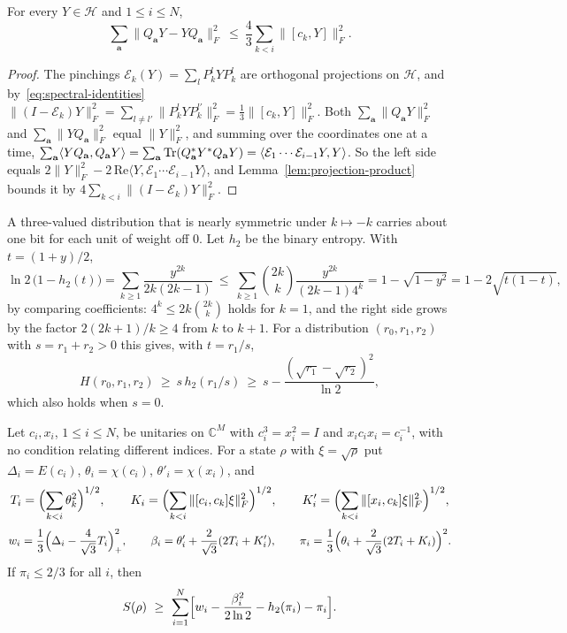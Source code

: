 \begin{lemma}\label{lem:transfer}
For every $Y\in\mathcal H$ and $1\le i\le N$,
\[
\sum_{\mathbf a}\|Q_{\mathbf a}Y-YQ_{\mathbf a}\|_F^2\ \le\ \frac43\sum_{k<i}\|[c_k,Y]\|_F^2 .
\]
\end{lemma}

\begin{proof}
The pinchings $\mathcal E_k(Y)=\sum_lP_k^lYP_k^l$ are orthogonal projections on $\mathcal H$, and by~\eqref{eq:spectral-identities}
$\|(I-\mathcal E_k)Y\|_F^2=\sum_{l\ne l'}\|P_k^lYP_k^{l'}\|_F^2=\frac13\|[c_k,Y]\|_F^2$. Both $\sum_{\mathbf a}\|Q_{\mathbf a}Y\|_F^2$ and
$\sum_{\mathbf a}\|YQ_{\mathbf a}\|_F^2$ equal $\|Y\|_F^2$, and summing over the coordinates one at a time,
$\sum_{\mathbf a}\langle YQ_{\mathbf a},Q_{\mathbf a}Y\rangle=\sum_{\mathbf a}\operatorname{Tr}(Q_{\mathbf a}^*Y^*Q_{\mathbf a}Y)=\langle\mathcal E_1\cdots\mathcal E_{i-1}Y,Y\rangle$.
So the left side equals $2\|Y\|_F^2-2\,\mathrm{Re}\langle Y,\mathcal E_1\cdots\mathcal E_{i-1}Y\rangle$, and Lemma~\ref{lem:projection-product} bounds it by
$4\sum_{k<i}\|(I-\mathcal E_k)Y\|_F^2$.
\end{proof}

A three-valued distribution that is nearly symmetric under $k\mapsto-k$ carries about one bit for each unit of weight off $0$. Let $h_2$ be the
binary entropy. With $t=(1+y)/2$,
\[
\ln2\,\bigl(1-h_2(t)\bigr)=\sum_{k\ge1}\frac{y^{2k}}{2k(2k-1)}\ \le\ \sum_{k\ge1}\binom{2k}k\frac{y^{2k}}{(2k-1)4^k}=1-\sqrt{1-y^2}=1-2\sqrt{t(1-t)},
\]
by comparing coefficients: $4^k\le2k\binom{2k}k$ holds for $k=1$, and the right side grows by the factor $2(2k+1)/k\ge4$ from $k$ to $k+1$. For a
distribution $(r_0,r_1,r_2)$ with $s=r_1+r_2>0$ this gives, with $t=r_1/s$,
\begin{equation}\label{eq:binary-hellinger}
H(r_0,r_1,r_2)\ \ge\ s\,h_2(r_1/s)\ \ge\ s-\frac{(\sqrt{r_1}-\sqrt{r_2})^2}{\ln2},
\end{equation}
which also holds when $s=0$.

\begin{theorem}\label{thm:sector}
Let $c_i,x_i$, $1\le i\le N$, be unitaries on $\mathbb C^M$ with $c_i^3=x_i^2=I$ and $x_ic_ix_i=c_i^{-1}$, with no condition relating different
indices. For a state $\rho$ with $\xi=\sqrt\rho$ put $\Delta_i=E(c_i)$, $\theta_i=\chi(c_i)$, $\theta'_i=\chi(x_i)$, and
\[
T_i=\Bigl(\sum_{k<i}\theta_k^2\Bigr)^{1/2},\qquad K_i=\Bigl(\sum_{k<i}\|[c_i,c_k]\xi\|_F^2\Bigr)^{1/2},\qquad K'_i=\Bigl(\sum_{k<i}\|[x_i,c_k]\xi\|_F^2\Bigr)^{1/2},
\]
\[
w_i=\frac13\Bigl(\Delta_i-\frac4{\sqrt3}T_i\Bigr)_+^2,\qquad\beta_i=\theta'_i+\frac2{\sqrt3}(2T_i+K'_i),\qquad
\pi_i=\frac13\Bigl(\theta_i+\frac2{\sqrt3}(2T_i+K_i)\Bigr)^2 .
\]
If $\pi_i\le2/3$ for all $i$, then
\[
S(\rho)\ \ge\ \sum_{i=1}^N\Bigl[w_i-\frac{\beta_i^2}{2\ln2}-h_2(\pi_i)-\pi_i\Bigr].
\]
\end{theorem}

